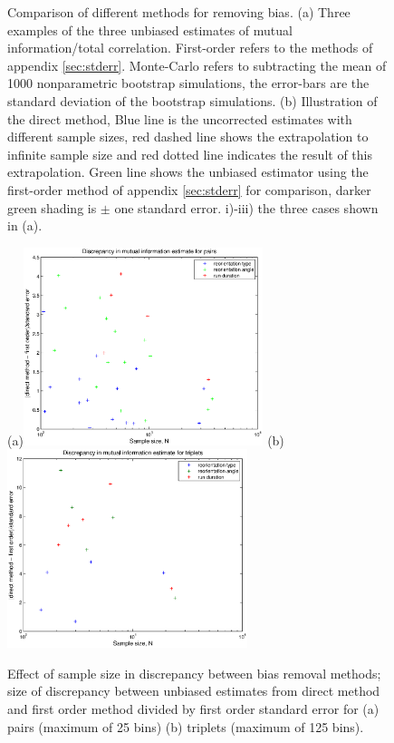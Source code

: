 \documentclass[12pt]{article}
\begin{document}
\begin{figure}
  \caption{Comparison of different methods for removing bias. (a) Three examples of the three unbiased estimates of mutual information/total correlation. First-order refers to the methods of appendix \ref{sec:stderr}. Monte-Carlo refers to subtracting the mean of 1000 nonparametric bootstrap simulations, the error-bars are the standard deviation of the bootstrap simulations. (b) Illustration of the direct method, Blue line is the uncorrected estimates with different sample sizes, red dashed line shows the extrapolation to infinite sample size and red dotted line indicates the result of this extrapolation. Green line shows the unbiased estimator using the first-order method of appendix \ref{sec:stderr} for comparison, darker green shading is $\pm$ one standard error. i)-iii) the three cases shown in (a).} \label{fig:biascomp}
\end{figure}

\begin{figure}
  \begin{center}
    (a)\includegraphics[width=7cm]{discpair.eps}
    (b)\includegraphics[width=7cm]{disctrip.eps}
  \end{center}
  \caption{Effect of sample size in discrepancy between bias removal methods; size of discrepancy between unbiased estimates from direct method and first order method divided by first order standard error for (a) pairs (maximum of 25 bins) (b) triplets (maximum of 125 bins).} \label{fig:discrep}
\end{figure}
\end{document}
